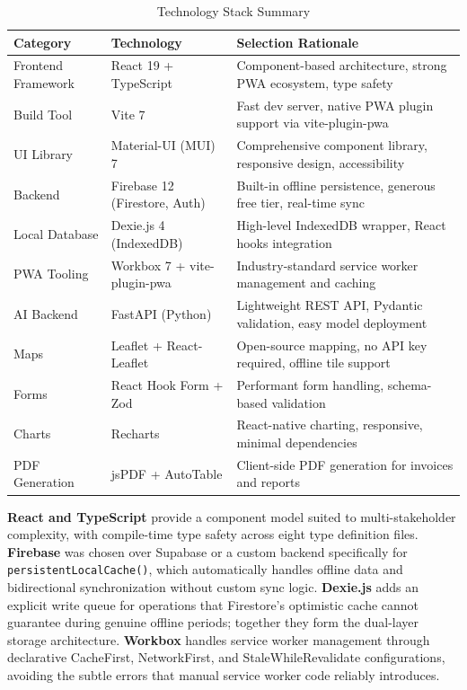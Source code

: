 \begin{table}[H]
\centering
\caption{Technology Stack Summary}
\label{tab:tech-stack}
\small
\begin{tabular}{p{3.0cm}p{2.8cm}p{6.0cm}}
\toprule
\textbf{Category} & \textbf{Technology} & \textbf{Selection Rationale} \\
\midrule
Frontend Framework  & React 19 + TypeScript          & Component-based architecture, strong PWA ecosystem, type safety \\
Build Tool          & Vite 7                         & Fast dev server, native PWA plugin support via vite-plugin-pwa \\
UI Library          & Material-UI (MUI) 7            & Comprehensive component library, responsive design, accessibility \\
Backend             & Firebase 12 (Firestore, Auth)  & Built-in offline persistence, generous free tier, real-time sync \\
Local Database      & Dexie.js 4 (IndexedDB)         & High-level IndexedDB wrapper, React hooks integration \\
PWA Tooling         & Workbox 7 + vite-plugin-pwa    & Industry-standard service worker management and caching \\
AI Backend          & FastAPI (Python)                & Lightweight REST API, Pydantic validation, easy model deployment \\
Maps                & Leaflet + React-Leaflet        & Open-source mapping, no API key required, offline tile support \\
Forms               & React Hook Form + Zod          & Performant form handling, schema-based validation \\
Charts              & Recharts                       & React-native charting, responsive, minimal dependencies \\
PDF Generation      & jsPDF + AutoTable              & Client-side PDF generation for invoices and reports \\
\bottomrule
\end{tabular}
\end{table}

\textbf{React and TypeScript} provide a component model suited to multi-stakeholder complexity, with compile-time type safety across eight type definition files. \textbf{Firebase} was chosen over Supabase or a custom backend specifically for \texttt{persistentLocalCache()}, which automatically handles offline data and bidirectional synchronization without custom sync logic. \textbf{Dexie.js} adds an explicit write queue for operations that Firestore's optimistic cache cannot guarantee during genuine offline periods; together they form the dual-layer storage architecture. \textbf{Workbox} handles service worker management through declarative CacheFirst, NetworkFirst, and StaleWhileRevalidate configurations, avoiding the subtle errors that manual service worker code reliably introduces.

